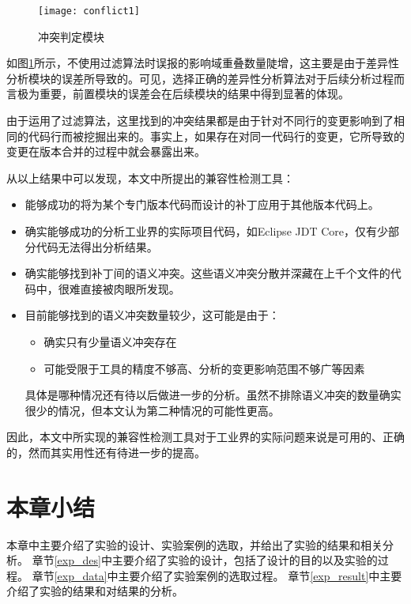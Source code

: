 \begin{figure}[H]
	\centering
	\texttt{[image: conflict1]}
	\caption {冲突判定模块}
	\label {conflict_data}	
\end{figure}

如图\ref {conflict_data}所示，不使用过滤算法时误报的影响域重叠数量陡增，这主要是由于差异性分析模块的误差所导致的。可见，选择正确的差异性分析算法对于后续分析过程而言极为重要，前置模块的误差会在后续模块的结果中得到显著的体现。

由于运用了过滤算法，这里找到的冲突结果都是由于针对不同行的变更影响到了相同的代码行而被挖掘出来的。事实上，如果存在对同一代码行的变更，它所导致的变更在版本合并的过程中就会暴露出来。

从以上结果中可以发现，本文中所提出的兼容性检测工具：
\begin{itemize}
	\item 能够成功的将为某个专门版本代码而设计的补丁应用于其他版本代码上。
	\item 确实能够成功的分析工业界的实际项目代码，如Eclipse JDT Core，仅有少部分代码无法得出分析结果。
	\item 确实能够找到补丁间的语义冲突。这些语义冲突分散并深藏在上千个文件的代码中，很难直接被肉眼所发现。
	\item 目前能够找到的语义冲突数量较少，这可能是由于：
		\begin{itemize}
			\item 确实只有少量语义冲突存在
			\item 可能受限于工具的精度不够高、分析的变更影响范围不够广等因素
		\end{itemize}
		具体是哪种情况还有待以后做进一步的分析。虽然不排除语义冲突的数量确实很少的情况，但本文认为第二种情况的可能性更高。
\end{itemize}

因此，本文中所实现的兼容性检测工具对于工业界的实际问题来说是可用的、正确的，然而其实用性还有待进一步的提高。

\section{本章小结}
本章中主要介绍了实验的设计、实验案例的选取，并给出了实验的结果和相关分析。
章节\ref {exp_des}中主要介绍了实验的设计，包括了设计的目的以及实验的过程。
章节\ref {exp_data}中主要介绍了实验案例的选取过程。
章节\ref {exp_result}中主要介绍了实验的结果和对结果的分析。